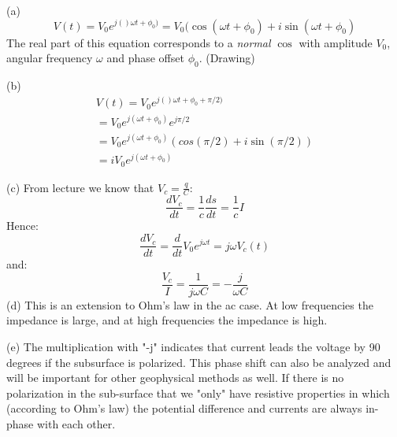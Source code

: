 \ifanswers
    \begin{tcolorbox}[enhanced jigsaw,breakable,pad at break*=1mm,
    colback=blue!5!white,colframe=babyblueeyes,title=Solutions,
    watermark color=white]
    (a)
    $$
    V(t) = V_0e^{j()\omega t+\phi_0)} = V_0 (\cos(\omega t+\phi_0)+i\sin(\omega t+\phi_0)
    $$
    The real part of this equation corresponds to a \textit{normal} $\cos$ with amplitude $V_0$, angular frequency $\omega$ and phase offset $\phi_0$. (Drawing)

    (b)
    \begin{eqnarray}
    V(t) = V_0e^{j()\omega t+\phi_0+\pi/2)}  \\
    = V_0e^{j(\omega t+\phi_0)}e^{j\pi/2} \\
    = V_0e^{j(\omega t+\phi_0)}(cos(\pi/2)+i\sin(\pi/2)) \\
    =i V_0e^{j(\omega t+\phi_0)}
    \end{eqnarray}
  

    (c)
    From lecture we know that $V_c = \frac{q}{C}$:
    $$
    \frac{dV_c}{dt} = \frac{1}{c}\frac{ds}{dt} = \frac{1}{c}I
    $$
    Hence:
    $$
    \frac{dV_c}{dt} = \frac{d}{dt}V_0e^{j\omega t}=j\omega V_c(t)
    $$
    and:
    $$
    \frac{V_c}{I} = \frac{1}{j\omega C} = -\frac{j}{\omega C}
    $$
    (d)
    This is an extension to Ohm's law in the ac case. At low frequencies the impedance is large, and at high frequencies the impedance is high. 
    
    (e) The multiplication with "-j" indicates that current leads the voltage by 90 degrees if the subsurface is polarized. This phase shift can also be analyzed and will be important for other geophysical methods as well. If there is no polarization in the sub-surface that we "only" have resistive properties in which (according to Ohm's law) the potential difference and currents are always in-phase with each other.

\end{tcolorbox}
\fi

